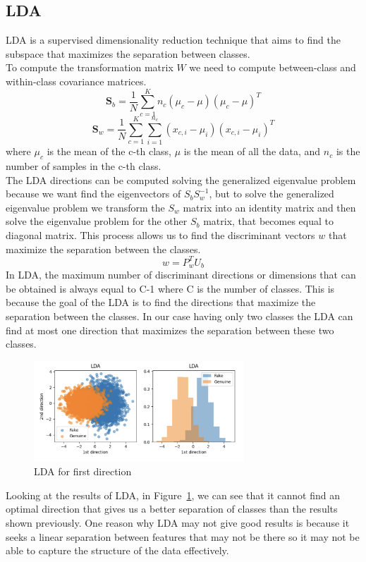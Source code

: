 \documentclass{article}
\begin{document}
\subsection{LDA}
LDA is a supervised dimensionality reduction technique that aims to find the subspace that maximizes the separation between classes. \\
To compute the transformation matrix \( W \) we need to compute between-class and within-class covariance matrices.
\begin{equation}
\mathbf{S}_b =\frac{1}{N}\sum_{c=1}^{K} n_c (\mu_c - \mu)(\mu_c - \mu)^T
\end{equation}
\begin{equation}
    \mathbf{S}_w = \frac{1}{N}\sum_{c=1}^{K} \sum_{i=1}^{n_c} (x_{c,i} - \mu_i)(x_{c,i} - \mu_i)^T
    \end{equation}
where \( \mu_c \) is the mean of the c-th class, \( \mu \) is the mean of all the data, and \( n_c \) is the number of samples in the c-th class.\\
The LDA directions can be computed solving the generalized eigenvalue problem because we want find the eigenvectors of \(S_bS_w^{-1} \), but to solve the generalized eigenvalue problem we transform the \(S_w\) matrix into an identity matrix and then solve the eigenvalue problem for the other \(S_b \) matrix, that becomes equal to diagonal matrix. This process allows us to find the discriminant vectors \(w\) that maximize the separation between the classes.
\begin{equation}
    w=P_w^T U_b
\end{equation}
In LDA, the maximum number of discriminant directions or dimensions that can be obtained is always equal to C-1 where C is the number of classes. This is because the goal of the LDA is to find the directions that maximize the separation between the classes. 
In our case having only two classes the LDA can find at most one direction that maximizes the separation between these two classes.
\begin{figure}[H]
    \centering
    \includegraphics[width=0.7\textwidth]{./img/LDA.png}
    \caption{LDA for first direction}
    \label{fig:LDA}
\end{figure} 
Looking at the results of LDA, in Figure~\ref{fig:LDA}, we can see that it cannot find an optimal direction that gives us a better separation of classes than the results shown previously.
One reason why LDA may not give good results is because it seeks a linear separation between features that may not be there so it may not be able to capture the structure of the data effectively.
\end{document}
